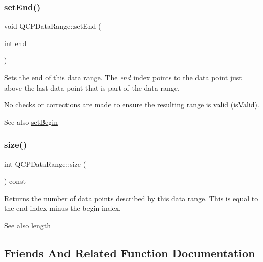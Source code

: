 \subsubsection{\texorpdfstring{set\+End()}{setEnd()}}
{\footnotesize\ttfamily void Q\+C\+P\+Data\+Range\+::set\+End (\begin{DoxyParamCaption}\item[{int}]{end }\end{DoxyParamCaption})\hspace{0.3cm}{\ttfamily [inline]}}

Sets the end of this data range. The {\itshape end} index points to the data point just above the last data point that is part of the data range.

No checks or corrections are made to ensure the resulting range is valid (\hyperlink{class_q_c_p_data_range_aae53a37472212dca0a7939963e20dba0}{is\+Valid}).

\begin{DoxySeeAlso}{See also}
\hyperlink{class_q_c_p_data_range_a54ff59048e01e46ac4aefafc844626c6}{set\+Begin} 
\end{DoxySeeAlso}
\mbox{\label{class_q_c_p_data_range_ac6af055e509d1b691c244954ff1c5887}} 
\subsubsection{\texorpdfstring{size()}{size()}}
{\footnotesize\ttfamily int Q\+C\+P\+Data\+Range\+::size (\begin{DoxyParamCaption}{ }\end{DoxyParamCaption}) const\hspace{0.3cm}{\ttfamily [inline]}}

Returns the number of data points described by this data range. This is equal to the end index minus the begin index.

\begin{DoxySeeAlso}{See also}
\hyperlink{class_q_c_p_data_range_a1e7836058f755c6ab9f11996477b7150}{length} 
\end{DoxySeeAlso}


\subsection{Friends And Related Function Documentation}
\mbox{\label{class_q_c_p_data_range_a486dd7af8a090ed069672e3510e6a082}} 
